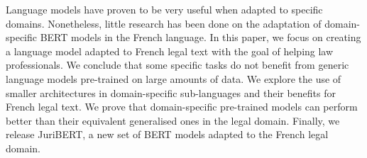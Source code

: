 Language models have proven to be very useful when adapted to specific domains. Nonetheless, little research has been done on the adaptation of domain-specific BERT models in the French language. In this paper, we focus on creating a language model adapted to French legal text with the goal of helping law professionals. We conclude that some specific tasks do not benefit from generic language models pre-trained on large amounts of data. We explore the use of smaller architectures in domain-specific sub-languages and their benefits for French legal text. We prove that domain-specific pre-trained models can perform better than their equivalent generalised ones in the legal domain. Finally, we release JuriBERT, a new set of BERT models adapted to the French legal domain.
